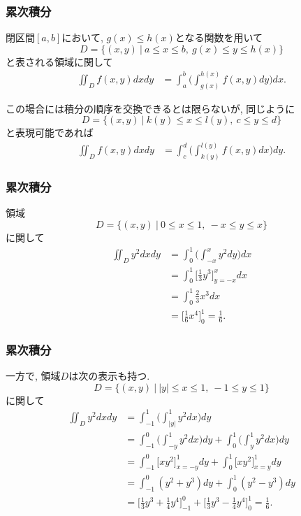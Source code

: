 \begin{frame}
\frametitle{累次積分}

\vspace{-2mm}

\begin{Thm}
閉区間$[a,b]$において, $g(x) \le h(x)$となる関数を用いて
$$
D=\{(x,y) \ | \ a \le x \le b, \ g(x) \le y \le h(x)\}
$$
と表される領域に関して
\begin{align*}
\iint_Df(x,y)dxdy &= \int_a^b\big( \int_{g(x)}^{h(x)} f(x,y)dy\big)dx. 
\end{align*}
\end{Thm}
この場合には積分の順序を交換できるとは限らないが, 同じように
$$
D=\{(x,y) \ | \ k(y) \le x \le l(y), \ c \le y \le d\}
$$
と表現可能であれば
\begin{align*}
\iint_Df(x,y)dxdy &= \int_c^d\big( \int_{k(y)}^{l(y)} f(x,y)dx\big)dy. 
\end{align*}
\end{frame}





\begin{frame}
\frametitle{累次積分}


領域
$$
D=\{(x,y) \ | \ 0 \le x \le 1, \ -x\le y \le x\}
$$
に関して
\begin{align*}
\iint_Dy^2 dxdy &= \int_0^1\big( \int_{-x}^x y^2dy\big)dx \\
 & = \int_0^1\big[\frac{1}{3}y^3\big]_{y=-x}^xdx\\
& = \int_0^1 \frac{2}{3}x^3dx \\
&  = \big[ \frac{1}{6} x^4 \big]_0^1=\frac{1}{6}. 
\end{align*}

\end{frame}





\begin{frame}
\frametitle{累次積分}


一方で, 領域$D$は次の表示も持つ. 
$$
D=\{(x,y) \ | \ |y| \le x \le 1, \ -1 \le y \le 1\}
$$
に関して
\begin{align*}
\iint_Dy^2 dxdy &= \int_{-1}^1\big( \int_{|y|}^1 y^2dx\big)dy \\
&= \int_{-1}^0\big( \int_{-y}^1 y^2dx\big)dy + \int_{0}^1\big( \int_{y}^1 y^2dx\big)dy \\
 & = \int_{-1}^0 \big[xy^2\big]_{x=-y}^1dy + \int_{0}^1 \big[xy^2\big]_{x=y}^1dy \\
 & = \int_{-1}^0 (y^2+y^3)dy + \int_{0}^1 (y^2-y^3)dy \\
&  = \big[ \frac{1}{3}y^3+\frac{1}{4}y^4\big]_{-1}^0 + \big[ \frac{1}{3}y^3-\frac{1}{4}y^4\big]_{0}^1=\frac{1}{6}. 
\end{align*}

\end{frame}


